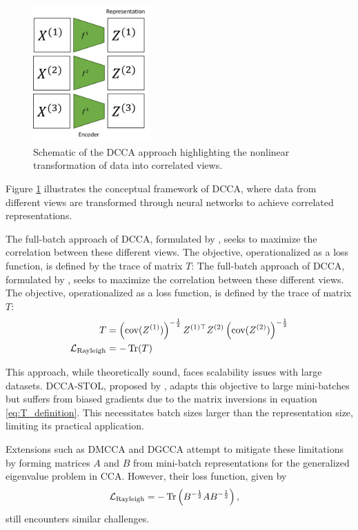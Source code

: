 \begin{figure}
    \centering
    \includegraphics[width=0.4\textwidth]{figures/dcca_schematic}
    \caption{Schematic of the DCCA approach highlighting the nonlinear transformation of data into correlated views.}
    \label{fig:dcca_schematic}
\end{figure}

Figure \ref{fig:dcca_schematic} illustrates the conceptual framework of DCCA, where data from different views are transformed through neural networks to achieve correlated representations.

The full-batch approach of DCCA, formulated by \citet{andrew2013deep}, seeks to maximize the correlation between these different views. The objective, operationalized as a loss function, is defined by the trace of matrix \( T \):
The full-batch approach of DCCA, formulated by \citet{andrew2013deep}, seeks to maximize the correlation between these different views. The objective, operationalized as a loss function, is defined by the trace of matrix \( T \):
\begin{align}
    T &= \left(\text{cov}(Z^{(1)})\right)^{-\frac{1}{2}} Z^{(1)\top} Z^{(2)} \left(\text{cov}(Z^{(2)})\right)^{-\frac{1}{2}} \label{eq:T_definition} \\
    \mathcal{L}_\text{Rayleigh} &= -\operatorname{Tr}(T) \label{eq:loss_function}
\end{align}

This approach, while theoretically sound, faces scalability issues with large datasets. DCCA-STOL, proposed by \citet{wang2015unsupervised}, adapts this objective to large mini-batches but suffers from biased gradients due to the matrix inversions in equation \eqref{eq:T_definition}. This necessitates batch sizes larger than the representation size, limiting its practical application.

Extensions such as DMCCA \citep{somandepalli2019multimodal} and DGCCA \citep{benton2017deep} attempt to mitigate these limitations by forming matrices \( A \) and \( B \) from mini-batch representations for the generalized eigenvalue problem in CCA. However, their loss function, given by
\begin{align}
    \mathcal{L}_\text{Rayleigh} &= -\operatorname{Tr}\left(B^{-\frac{1}{2}} A B^{-\frac{1}{2}}\right),
\end{align}
still encounters similar challenges.

